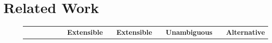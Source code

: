 \documentclass[10pt,preprint]{sigplanconf}
\begin{document}
{%
%
%

\section{Related Work}\label{related}

%
\begin{figure*}
\small
\vspace{-10pt}
\onecolumn
\begin{longtable}{l l@{}l c@{}c c@{}c c@{}c c@{}c c@{}c}

&&  &&  && {\bfseries Extensible} && {\bfseries Extensible} && {\bfseries Unambiguous} && {\bfseries Alternative}\\


\end{longtable}
\end{figure*}}
\end{document}
